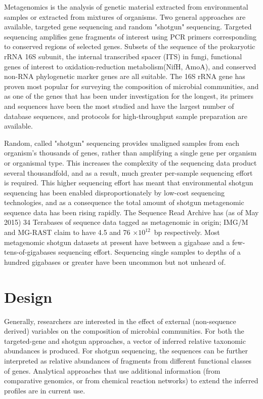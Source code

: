 \documentclass[graybox]{svmult}
\begin{document}
Metagenomics is the analysis of genetic material extracted from environmental samples or extracted from mixtures of organisms.  Two general approaches are available, targeted gene sequencing and random "shotgun" sequencing.    Targeted sequencing amplifies gene fragments of interest using PCR primers corresponding to conserved regions of selected genes.   Subsets of the sequence of the prokaryotic  rRNA 16S subunit, the internal transcribed spacer (ITS) in fungi, functional genes of interest to oxidation-reduction metabolism(NifH, AmoA), and conserved non-RNA phylogenetic marker genes are all suitable.  The 16S rRNA gene has proven most popular for surveying the composition of microbial communities, and as one of the genes that has been under investigation for the longest, its primers and sequences have been the most studied and have the largest number of database sequences, and protocols for high-throughput sample preparation are available.\cite{Caporaso2012Ultrahighthroughput}

Random, called "shotgun" sequencing provides unaligned samples from each organism's thousands of genes, rather than amplifying a single gene per organism or organismal type.  This increases the complexity of the sequencing data product several thousandfold, and as a result, much greater per-sample sequencing effort is required.
This higher sequencing effort has meant that environmental shotgun sequencing has been enabled disproportionately by low-cost sequencing technologies, and as a consequence the total amount of shotgun metagenomic sequence data has been rising rapidly.   The Sequence Read Archive has (as of May 2015) 34 Terabases of sequence data tagged as metagenomic in origin; IMG/M and MG-RAST claim to have 4.5  and 76 $\times 10^{12}$~bp respectively. 
Most metagenomic shotgun datasets at present have between a gigabase and a few-tens-of-gigabases sequencing effort.  
Sequencing single samples to depths of a hundred gigabases or greater have been uncommon but not unheard of.

\section{Design}

Generally, researchers are interested in the effect of external (non-sequence derived) variables on the composition of microbial communities.  For both the targeted-gene and shotgun approaches, a vector of inferred relative taxonomic abundances is produced.  For shotgun sequencing, the sequences can be further interpreted as relative abundances of fragments from different functional classes of genes.  Analytical approaches that use additional information (from comparative genomics, or from chemical reaction networks) to extend the inferred profiles are in current use.  
\end{document}
